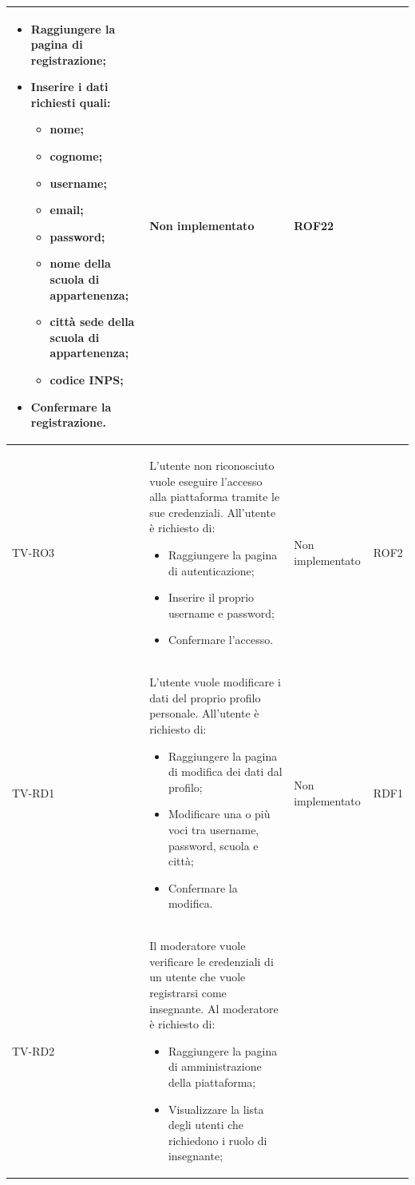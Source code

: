 \begin{longtable}{|>{\centering\arraybackslash}m{1.6cm}|>{\centering\arraybackslash}m{6.41cm}|>{\centering\arraybackslash}m{3.1cm} | >{\centering\arraybackslash}m{2.6cm}|}
\begin{itemize}
			\item Raggiungere la pagina di registrazione;
			\item Inserire i dati richiesti quali:
				\begin{itemize}
				 	\item nome;
				 	\item cognome;
				 	\item username;
				 	\item email;
				 	\item password;
				 	\item nome della scuola di appartenenza;
				 	\item città sede della scuola di appartenenza;
				 	\item codice INPS;
				\end{itemize}
			\item Confermare la registrazione.
		\end{itemize} & Non implementato & ROF22 \\ \hline
		TV-RO3 & L'utente non riconosciuto vuole eseguire l'accesso alla piattaforma tramite le sue credenziali. All'utente è richiesto di: 
		\begin{itemize}
			\item Raggiungere la pagina di autenticazione;
			\item Inserire il proprio username e password;
			\item Confermare l'accesso.
		\end{itemize} & Non implementato 
		& ROF2 \\ \hline
		  \rowcolor{LightGray}
		TV-RD1 & L'utente vuole modificare i dati del proprio profilo personale. All'utente è richiesto di:
		\begin{itemize}
			\item Raggiungere la pagina di modifica dei dati dal profilo;
			\item Modificare una o più voci tra username, password, scuola e città;
			\item Confermare la modifica.
		\end{itemize}& Non implementato  & RDF1 \\ \hline
		TV-RD2 & Il  moderatore vuole verificare le credenziali di un utente che vuole registrarsi come insegnante. Al moderatore è richiesto di:
		\begin{itemize}
			\item Raggiungere la pagina di amministrazione della piattaforma;
			\item Visualizzare la lista degli utenti che richiedono i  ruolo di insegnante;

\end{itemize}
\end{longtable}
